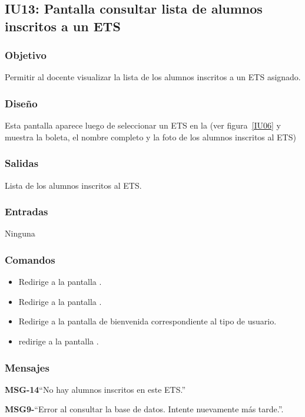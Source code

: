 \subsection{IU13: Pantalla consultar lista de alumnos inscritos a un ETS}

\subsubsection{Objetivo}
Permitir al docente visualizar la lista de los alumnos inscritos a un ETS asignado.

\subsubsection{Diseño}
Esta pantalla aparece luego de seleccionar un ETS en la  (ver figura~\ref{IU06} y muestra la boleta, el nombre completo y la foto de los alumnos inscritos al ETS)


\subsubsection{Salidas}
Lista de los alumnos inscritos al ETS.

\subsubsection{Entradas}
Ninguna

\subsubsection{Comandos}
\begin{itemize}
    \item {} Redirige a la pantalla .
    \item {} Redirige a la pantalla .
    \item {} Redirige a la pantalla de bienvenida correspondiente al tipo de usuario.
	\item {} redirige a la pantalla .
\end{itemize}

\subsubsection{Mensajes}

\begin{Citemize}
	\item {\bf MSG-14}{``No hay alumnos inscritos en este ETS.''}
	\item {\bf MSG9-}{``Error al consultar la base de datos. Intente nuevamente más tarde.''}. 
\end{Citemize}